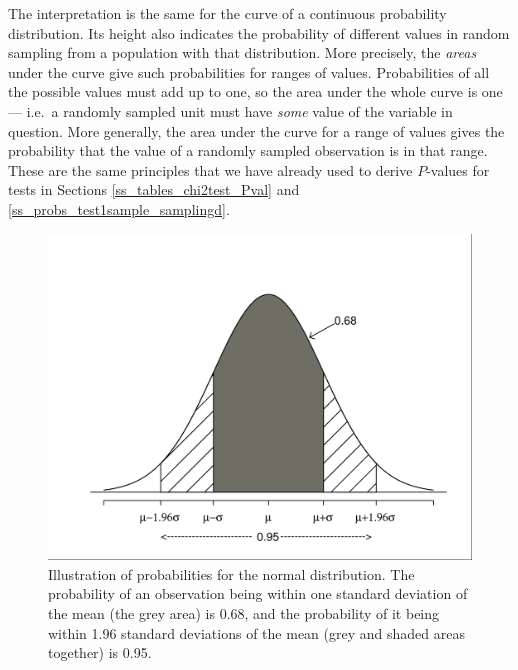 The interpretation is the same for the curve of a continuous probability
distribution. Its height also indicates the probability of
different values in random sampling from a population
with that distribution. More precisely, the \emph{areas} under the curve
give such probabilities for ranges of values. Probabilities of all the
possible values must add up to one, so the area under the whole
curve is one --- i.e.\ a randomly sampled unit must have \emph{some}
value of the variable in question. More generally, the area under the
curve for a range of values gives the probability that the value of a
randomly sampled observation is in that range. These are the same
principles that we have already used to derive $P$-values for tests in
Sections \ref{ss_tables_chi2test_Pval} and
\ref{ss_probs_test1sample_samplingd}.

\begin{figure}[t]
\caption{Illustration of probabilities for the normal distribution.
The probability of an observation being within one standard deviation of
the mean (the grey area) is 0.68, and the probability of it being within
1.96 standard deviations of the mean (grey and shaded areas together) is
0.95.}
\label{f_norm1}
\begin{center}
\includegraphics[width=12cm]{norm1}
\end{center}
\vspace*{-2ex}
\end{figure}

